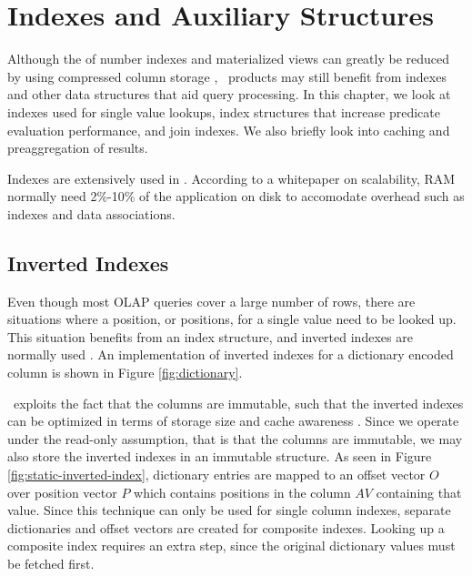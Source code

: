\chapter{Indexes and Auxiliary Structures}
\label{chap:Indexes and Auxiliary Structures}
Although the of number indexes and materialized views can greatly be reduced by using compressed column storage \cite{Lahiri2015-mz}, \bd~products may still benefit from indexes and other data structures that aid query processing. In this chapter, we look at indexes used for single value lookups, index structures that increase predicate evaluation performance, and join indexes. We also briefly look into caching and preaggregation of results.

Indexes are extensively used in \qlikview. According to a whitepaper on scalability, RAM normally need 2\%-10\% of the application on disk to accomodate overhead such as indexes and data associations.

\newpage

\section{Inverted Indexes}
\label{sec:Inverted Indexes}


Even though most OLAP queries cover a large number of rows, there are situations where a position, or positions, for a single value need to be looked up. This situation benefits from an index structure, and inverted indexes are normally used \cite{Lemke2010-is}. An implementation of inverted indexes for a dictionary encoded column is shown in Figure \ref{fig:dictionary}. 

\hyrise~exploits the fact that the columns are immutable, such that the inverted indexes can be optimized in terms of storage size and cache awareness \cite{Schwalb2014-hn}. Since we operate under the read-only assumption, that is that the columns are immutable, we may also store the inverted indexes in an immutable structure. As seen in Figure \ref{fig:static-inverted-index}, dictionary entries are mapped to an offset vector $O$ over position vector $P$ which contains positions in the column $AV$ containing that value. Since this technique can only be used for single column indexes, separate dictionaries and offset vectors are created for composite indexes. Looking up a composite index requires an extra step, since the original dictionary values must be fetched first.

